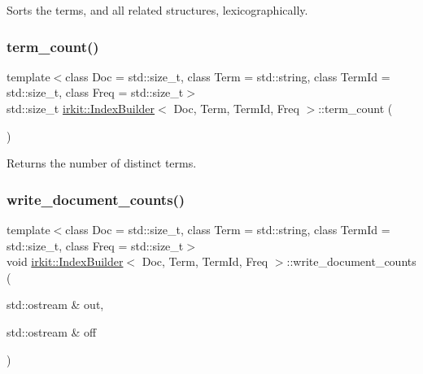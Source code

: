 Sorts the terms, and all related structures, lexicographically. 

\mbox{\label{classirkit_1_1IndexBuilder_abfd5cee3ad708bd89a0a1572479ba573}} 
\subsubsection{\texorpdfstring{term\+\_\+count()}{term\_count()}}
{\footnotesize\ttfamily template$<$class Doc  = std\+::size\+\_\+t, class Term  = std\+::string, class Term\+Id  = std\+::size\+\_\+t, class Freq  = std\+::size\+\_\+t$>$ \\
std\+::size\+\_\+t \hyperlink{classirkit_1_1IndexBuilder}{irkit\+::\+Index\+Builder}$<$ Doc, Term, Term\+Id, Freq $>$\+::term\+\_\+count (\begin{DoxyParamCaption}{ }\end{DoxyParamCaption})\hspace{0.3cm}{\ttfamily [inline]}}



Returns the number of distinct terms. 

\mbox{\label{classirkit_1_1IndexBuilder_aba0b947f29e491205adf3df3f862e58e}} 
\subsubsection{\texorpdfstring{write\+\_\+document\+\_\+counts()}{write\_document\_counts()}}
{\footnotesize\ttfamily template$<$class Doc  = std\+::size\+\_\+t, class Term  = std\+::string, class Term\+Id  = std\+::size\+\_\+t, class Freq  = std\+::size\+\_\+t$>$ \\
void \hyperlink{classirkit_1_1IndexBuilder}{irkit\+::\+Index\+Builder}$<$ Doc, Term, Term\+Id, Freq $>$\+::write\+\_\+document\+\_\+counts (\begin{DoxyParamCaption}\item[{std\+::ostream \&}]{out,  }\item[{std\+::ostream \&}]{off }\end{DoxyParamCaption})\hspace{0.3cm}{\ttfamily [inline]}}



